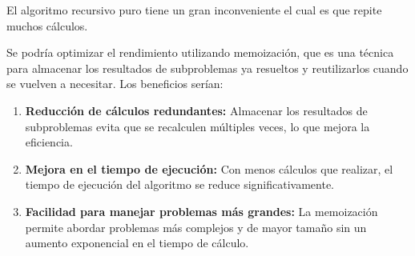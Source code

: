 El algoritmo recursivo puro tiene un gran inconveniente el cual es que repite muchos cálculos.

Se podría optimizar el rendimiento utilizando memoización, que es una técnica para almacenar los resultados de subproblemas ya resueltos y reutilizarlos cuando se vuelven a necesitar. Los beneficios serían:

\begin{enumerate}
    \item \textbf{Reducción de cálculos redundantes:} Almacenar los resultados de subproblemas evita que se recalculen múltiples veces, lo que mejora la eficiencia.
    \item \textbf{Mejora en el tiempo de ejecución:} Con menos cálculos que realizar, el tiempo de ejecución del algoritmo se reduce significativamente.
    \item \textbf{Facilidad para manejar problemas más grandes:} La memoización permite abordar problemas más complejos y de mayor tamaño sin un aumento exponencial en el tiempo de cálculo.
\end{enumerate}


